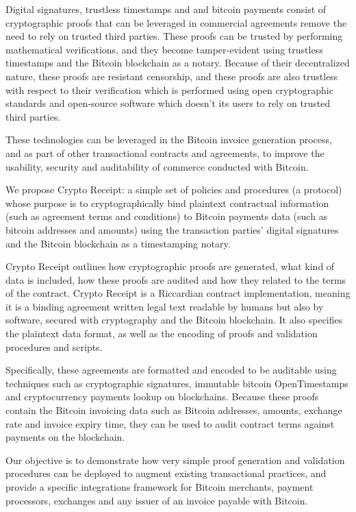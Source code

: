 Digital signatures, trustless timestamps and and bitcoin payments consist of cryptographic proofs that can be leveraged in commercial agreements remove the need to rely on trusted third parties. These proofs can be trusted by performing mathematical verifications, and they become tamper-evident using trustless timestamps and the Bitcoin blockchain as a notary. Because of their decentralized nature, these proofs are resistant censorship, and these proofs are also trustless with respect to their verification which is performed using open cryptographic standards and open-source software which doesn’t its users to rely on trusted third parties.

These technologies can be leveraged in the Bitcoin invoice generation process, and as part of other transactional contracts and agreements, to improve the usability, security and auditability of commerce conducted with Bitcoin.

We propose Crypto Receipt: a simple set of policies and procedures (a protocol)  whose purpose is to cryptographically bind plaintext contractual information (such as agreement terms and conditions) to Bitcoin payments data (such as bitcoin addresses and amounts) using the transaction parties’ digital signatures and the Bitcoin blockchain as a timestamping notary.

Crypto Receipt outlines how cryptographic proofs are generated, what kind of data is included, how these proofs are audited and how they related to the terms of the contract. Crypto Receipt is a Riccardian contract implementation, meaning it is a binding agreement written legal text readable by humans but also by software,  secured with cryptography and the Bitcoin blockchain. It also specifies the plaintext data format, as well as the encoding of proofs and validation procedures and scripts.

Specifically, these agreements are formatted and encoded to be auditable using techniques such as cryptographic signatures, immutable bitcoin OpenTimestamps and cryptocurrency payments lookup on blockchains. Because these proofs contain the Bitcoin invoicing data such as Bitcoin addresses, amounts, exchange rate and invoice expiry time, they can be used to audit contract terms against payments on the blockchain.

Our objective is to demonstrate how very simple proof generation and validation procedures can be deployed to augment existing transactional practices, and provide a specific integrations framework for Bitcoin merchants, payment processors, exchanges and any issuer of an invoice payable with Bitcoin.

